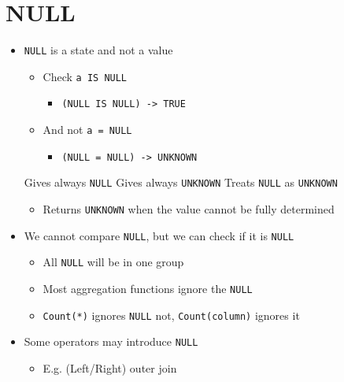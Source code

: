 
\section{NULL}
\begin{itemize}
    \item \verb+NULL+ is a state and not a value
        \begin{itemize}
            \item Check \verb+a IS NULL+
                \begin{itemize}
                    \item \verb+(NULL IS NULL) -> TRUE+
                \end{itemize}
            \item And not \verb+a = NULL+
                \begin{itemize}
                    \item \verb+(NULL = NULL) -> UNKNOWN+
                \end{itemize}
        \end{itemize}
     Gives always \verb+NULL+
     Gives always \verb+UNKNOWN+
     Treats \verb+NULL+ as \verb+UNKNOWN+
        \begin{itemize}
            \item Returns \verb+UNKNOWN+ when the value cannot be fully determined
        \end{itemize}
    \item We cannot compare \verb+NULL+, but we can check if it is \verb+NULL+
        \begin{itemize}
            \item All \verb+NULL+ will be in one group
            \item Most aggregation functions ignore the \verb+NULL+
            \item \verb+Count(*)+ ignores \verb+NULL+ not, \verb+Count(column)+ ignores it
        \end{itemize}
    \item Some operators may introduce \verb+NULL+
        \begin{itemize}
            \item E.g. (Left/Right) outer join
        \end{itemize}
\end{itemize}

